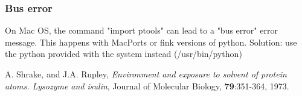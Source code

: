 \documentclass[12pt,a4paper]{article}
\begin{document}
\subsubsection{Bus error}
On Mac OS, the command "import ptools" can lead to a "bus error" error message. This happens with MacPorts or 
fink versions of python. Solution: use the python provided with the system instead (/usr/bin/python)



\begin{thebibliography}{99}

 A. Shrake, and J.A. Rupley, 
{\it Environment and exposure to solvent of protein atoms. Lysozyme and
isulin}, 
Journal of Molecular Biology, {\bf 79}:351-364, 1973.

\end{thebibliography}
\end{document}
